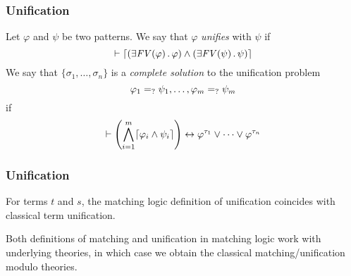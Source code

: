 \documentclass{beamer}
\begin{document}
\begin{frame}
\frametitle{Unification}

\begin{definition}
\label{def:unification}
Let $\varphi$ and $\psi$ be two patterns. We say that $\varphi$ \emph{unifies}
with $\psi$ if
\[\vdash \lceil\left(\exists \mathit{FV(\varphi)} \,.\, \varphi\right)
  \land \left(\exists \mathit{FV(\psi)} \,.\, \psi\right)\rceil\]
We say that $\{\sigma_1,\dots,\sigma_n\}$ is a \emph{complete solution}
to the unification problem
\[\varphi_1 =_? \psi_1, \dots, \varphi_m =_? \psi_m\]
if
\[\vdash \left(\bigwedge_{i=1}^m \lceil\varphi_i \land \psi_i\rceil\right)
  \leftrightarrow \varphi^{\tau_1} \lor \dots \lor \varphi^{\tau_n}
\]
\end{definition}
\end{frame}

\begin{frame}
\frametitle{Unification}

\begin{lemma}
For terms $t$ and $s$,
the matching logic definition of
unification coincides with classical term unification.
\end{lemma}

Both definitions of matching and unification
in matching logic
work with underlying theories, 
in which case we obtain the classical
matching/unification modulo theories.
\end{frame}
\end{document}
